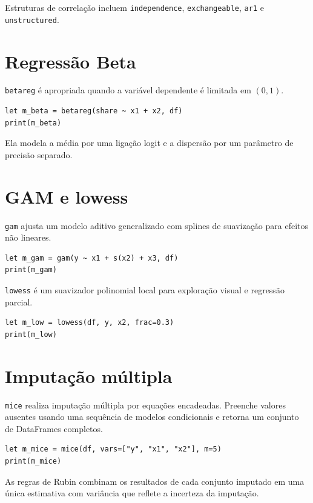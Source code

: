 Estruturas de correlação incluem \texttt{independence}, \texttt{exchangeable}, \texttt{ar1} e
\texttt{unstructured}.

\section{Regressão Beta}

\texttt{betareg} é apropriada quando a variável dependente é limitada em
$(0,1)$.

\begin{lstlisting}[caption={Regressão Beta}]
let m_beta = betareg(share ~ x1 + x2, df)
print(m_beta)
\end{lstlisting}

Ela modela a média por uma ligação logit e a dispersão por um parâmetro
de precisão separado.

\section{GAM e lowess}

\texttt{gam} ajusta um modelo aditivo generalizado com splines de suavização
para efeitos não lineares.

\begin{lstlisting}[caption={GAM}]
let m_gam = gam(y ~ x1 + s(x2) + x3, df)
print(m_gam)
\end{lstlisting}

\texttt{lowess} é um suavizador polinomial local para exploração visual e
regressão parcial.

\begin{lstlisting}[caption={Lowess}]
let m_low = lowess(df, y, x2, frac=0.3)
print(m_low)
\end{lstlisting}

\section{Imputação múltipla}

\texttt{mice} realiza imputação múltipla por equações encadeadas. Preenche
valores ausentes usando uma sequência de modelos condicionais e retorna
um conjunto de DataFrames completos.

\begin{lstlisting}[caption={MICE}]
let m_mice = mice(df, vars=["y", "x1", "x2"], m=5)
print(m_mice)
\end{lstlisting}

As regras de Rubin combinam os resultados de cada conjunto imputado em
uma única estimativa com variância que reflete a incerteza da imputação.
